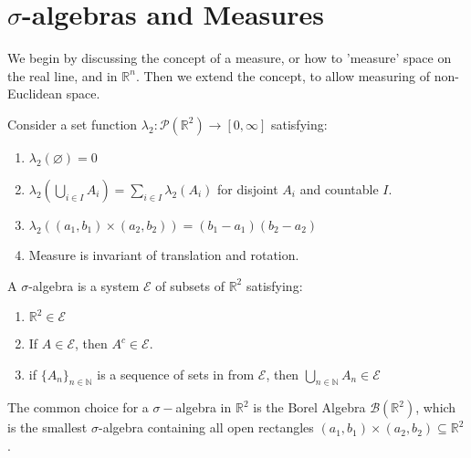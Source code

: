 \documentclass{article}
\begin{document}
\tableofcontents
\newpage

\section{$\sigma$-algebras and Measures}

We begin by discussing the concept of a measure, or how to 'measure' space on the real line, and in $\mathbb{R}^{n} $. Then we extend the concept, to allow measuring of non-Euclidean space. 
\begin{defn}
    Consider a set function $\lambda_2:\mathcal{P}(\mathbb{R}^2)\to [0,\infty]$ satisfying:
    \begin{enumerate}
        \item $\lambda_2(\varnothing)=0$
        \item  $\lambda_2\left(\bigcup_{i\in I} A_i\right)=\sum_{i\in I} \lambda_2(A_i)$ for disjoint $A_i$ and countable $I$.
        \item $\lambda_2((a_1,b_1)\times (a_2,b_2))=(b_1-a_1)(b_2-a_2)$
        \item Measure is invariant of translation and rotation.
    \end{enumerate}
\end{defn}

\begin{defn}
    A $\sigma$-algebra is a system $\mathcal{E}$ of subsets of $\mathbb{R}^2$ satisfying:
    \begin{enumerate}
        \item $\mathbb{R}^2\in \mathcal{E}$
        \item If $A\in \mathcal{E}$, then $A^{c}\in \mathcal{E}$.
        \item if $\{A_n\} _{n\in \mathbb{N}}$ is a sequence of sets in from $\mathcal{E}$, then $\bigcup_{n\in \mathbb{N}} A_n\in \mathcal{E}$
    \end{enumerate}
    The common choice for a $\sigma-$algebra in $\mathbb{R}^2$ is the Borel Algebra $\mathcal{B}(\mathbb{R}^2)$, which is the smallest $\sigma$-algebra containing all open rectangles $(a_1,b_1)\times (a_2,b_2)\subseteq \mathbb{R}^2$.
\end{defn}
\end{document}
